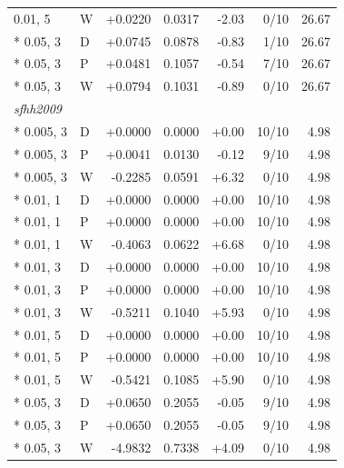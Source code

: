 \begin{longtable}{llrrrrr}
0.01, 5 & W & +0.0220 & 0.0317 & -2.03 & 0/10 & 26.67\\*
0.05, 3 & D & +0.0745 & 0.0878 & -0.83 & 1/10 & 26.67\\*
0.05, 3 & P & +0.0481 & 0.1057 & -0.54 & 7/10 & 26.67\\*
0.05, 3 & W & +0.0794 & 0.1031 & -0.89 & 0/10 & 26.67\\
\multicolumn{7}{l}{\textit{sfhh2009}}\\*
0.005, 3 & D & +0.0000 & 0.0000 & +0.00 & 10/10 & 4.98\\*
0.005, 3 & P & +0.0041 & 0.0130 & -0.12 & 9/10 & 4.98\\*
0.005, 3 & W & -0.2285 & 0.0591 & +6.32 & 0/10 & 4.98\\*
0.01, 1 & D & +0.0000 & 0.0000 & +0.00 & 10/10 & 4.98\\*
0.01, 1 & P & +0.0000 & 0.0000 & +0.00 & 10/10 & 4.98\\*
0.01, 1 & W & -0.4063 & 0.0622 & +6.68 & 0/10 & 4.98\\*
0.01, 3 & D & +0.0000 & 0.0000 & +0.00 & 10/10 & 4.98\\*
0.01, 3 & P & +0.0000 & 0.0000 & +0.00 & 10/10 & 4.98\\*
0.01, 3 & W & -0.5211 & 0.1040 & +5.93 & 0/10 & 4.98\\*
0.01, 5 & D & +0.0000 & 0.0000 & +0.00 & 10/10 & 4.98\\*
0.01, 5 & P & +0.0000 & 0.0000 & +0.00 & 10/10 & 4.98\\*
0.01, 5 & W & -0.5421 & 0.1085 & +5.90 & 0/10 & 4.98\\*
0.05, 3 & D & +0.0650 & 0.2055 & -0.05 & 9/10 & 4.98\\*
0.05, 3 & P & +0.0650 & 0.2055 & -0.05 & 9/10 & 4.98\\*
0.05, 3 & W & -4.9832 & 0.7338 & +4.09 & 0/10 & 4.98\\
\end{longtable}
